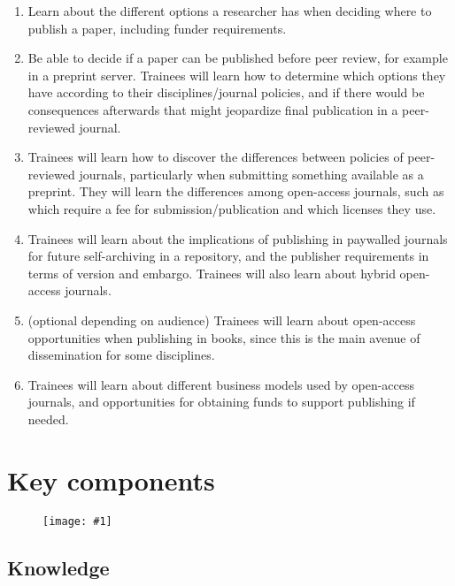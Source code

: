 \documentclass{article}
\newlength{\imgwidth}
\newcommand\scaledgraphics[2]{%
                
\settowidth{\imgwidth}{\texttt{[image: \#1]}}%
                
\setlength{\imgwidth}{\minof{\imgwidth}{#2\textwidth}}%
                
\texttt{[image: \#1]}%
                
}
\begin{document}
\begin{enumerate}
\item Learn about the different options a researcher has when deciding where to publish a paper, including funder requirements.


\item Be able to decide if a paper can be published before peer review, for example in a preprint server. Trainees will learn how to determine which options they have according to their disciplines/journal policies, and if there would be consequences afterwards that might jeopardize final publication in a peer-reviewed journal.


\item Trainees will learn how to discover the differences between policies of peer-reviewed journals, particularly when submitting something available as a preprint. They will learn the differences among open-access journals, such as which require a fee for submission/publication and which licenses they use.


\item Trainees will learn about the implications of publishing in paywalled journals for future self-archiving in a repository, and the publisher requirements in terms of version and embargo. Trainees will also learn about hybrid open-access journals.


\item (optional depending on audience) Trainees will learn about open-access opportunities when publishing in books, since this is the main avenue of dissemination for some disciplines.


\item Trainees will learn about different business models used by open-access journals, and opportunities for obtaining funds to support publishing if needed.


\end{enumerate}

\section{Key components}\label{key-components}


\begin{figure}
\scaledgraphics{27d237d8-8f65-4eb1-9c68-f087921c61b9.png}{1}
\label{F87600891}
\end{figure}


\subsection{Knowledge}\label{knowledge}
\end{document}
